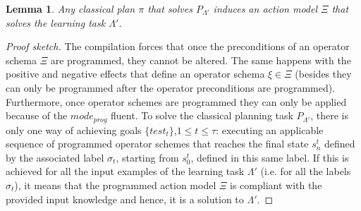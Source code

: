 \documentclass[letterpaper]{article} %
\newtheorem{lemma}[theorem]{Lemma}
\begin{document}
\begin{lemma}
Any classical plan $\pi$ that solves $P_{\Lambda'}$ induces an action model $\Xi$ that solves the learning task $\Lambda'$.
\end{lemma}

\begin{proof}[Proof sketch]
The compilation forces that once the preconditions of an operator schema $\Xi$ are programmed, they cannot be altered. The same happens with the positive and negative effects that define an operator schema $\xi \in \Xi$ (besides they can only be programmed after the operator preconditions are programmed). Furthermore, once operator schemes are programmed they can only be applied because of the $mode_{prog}$ fluent. To solve the classical planning task $P_{\Lambda'}$, there is only one way of achieving goals $\{test_t\}$,{\small $1\leq t\leq \tau$}: executing an applicable sequence of programmed operator schemes that reaches the final state $s_n^t$ defined by the associated label $\sigma_t$, starting from $s_0^t$, defined in this same label. If this is achieved for all the input examples of the learning task $\Lambda'$ (i.e. for all the labels $\sigma_t$), it means that the programmed action model $\Xi$ is compliant with the provided input knowledge and hence, it is a solution to $\Lambda'$.
 \end{proof}
\end{document}

